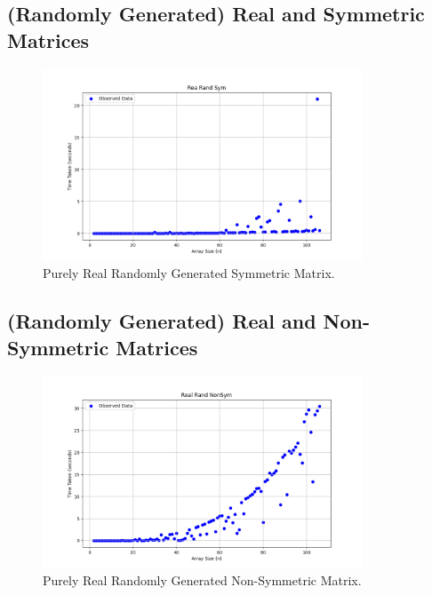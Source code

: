 \documentclass[12pt]{article}
\begin{document}
 	\subsection{(Randomly Generated) Real and Symmetric Matrices}
 	\begin{figure}[h]
 		\centering
 		\includegraphics[width=0.85\textwidth]{figs/rrs.png}
 		\caption{Purely Real Randomly Generated Symmetric Matrix.}
 	\end{figure}
 	\subsection{(Randomly Generated) Real and Non-Symmetric Matrices}
 	\begin{figure}[h]
 		\centering
 		\includegraphics[width=0.85\textwidth]{figs/rrns.png}
 		\caption{Purely Real Randomly Generated Non-Symmetric Matrix.}
 	\end{figure}
\end{document}
